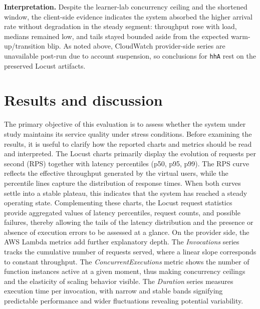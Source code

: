 \documentclass[11pt,a4paper]{article}
\begin{document}
\noindent\textbf{Interpretation.}
Despite the learner-lab concurrency ceiling and the shortened window, the client-side evidence indicates the system absorbed the higher arrival rate without degradation in the steady segment: throughput rose with load, medians remained low, and tails stayed bounded aside from the expected warm-up/transition blip. As noted above, CloudWatch provider-side series are unavailable post-run due to account suspension, so conclusions for \texttt{hhA} rest on the preserved Locust artifacts.

\section{Results and discussion}
The primary objective of this evaluation is to assess whether the system under study maintains its service quality under stress conditions. 
Before examining the results, it is useful to clarify how the reported charts and metrics should be read and interpreted. The Locust charts primarily display the evolution of requests per second (RPS) together with latency percentiles (p50, p95, p99). The RPS curve reflects the effective throughput generated by the virtual users, while the percentile lines capture the distribution of response times. When both curves settle into a stable plateau, this indicates that the system has reached a steady operating state.
Complementing these charts, the Locust request statistics provide aggregated values of latency percentiles, request counts, and possible failures, thereby allowing the tails of the latency distribution and the presence or absence of execution errors to be assessed at a glance. On the provider side, the AWS Lambda metrics add further explanatory depth. The \emph{Invocations} series tracks the cumulative number of requests served, where a linear slope corresponds to constant throughput. The \emph{ConcurrentExecutions} metric shows the number of function instances active at a given moment, thus making concurrency ceilings and the elasticity of scaling behavior visible. The \emph{Duration} series measures execution time per invocation, with narrow and stable bands signifying predictable performance and wider fluctuations revealing potential variability. 
\end{document}
